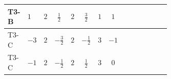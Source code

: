\documentclass[8pt]{article}
\begin{document}
\begin{landscape}
\begin{longtable}{@{}llcccccc >{\raggedright\arraybackslash}p{0.21\linewidth} >{\raggedright\arraybackslash}p{0.21\linewidth} >{\raggedright\arraybackslash}p{0.21\linewidth}@{}}
T3-B & $1$ & $2$ & $\frac{1}{2}$ & $2$ & $\frac{3}{2}$ & $1$ & $1$ & \scriptsize\adjustbox{max width=\linewidth}{$\begin{gathered} -\frac{3}{2} (\left({Y_d}\,\left({Y_d}\right)^{\dagger}\,{Y_u}\right)_{ij}-\left({Y_u}\,\left({Y_u}\right)^{\dagger}\,{Y_u}\right)_{ij})\end{gathered}$} & \scriptsize\adjustbox{max width=\linewidth}{$\begin{gathered} -\frac{9}{4} {g_2}^2 \left({Y_u}\right)_{ij}\end{gathered}$} & \scriptsize\adjustbox{max width=\linewidth}{$\begin{gathered} -8 {g_3}^2 \left({Y_u}\right)_{ij}\end{gathered}$} \\
\midrule
T3-C & $-3$ & $2$ & $-\frac{3}{2}$ & $2$ & $-\frac{1}{2}$ & $3$ & $-1$ & \scriptsize\adjustbox{max width=\linewidth}{$\begin{gathered} -\frac{3}{2} (\left({Y_d}\,\left({Y_d}\right)^{\dagger}\,{Y_u}\right)_{ij}-\left({Y_u}\,\left({Y_u}\right)^{\dagger}\,{Y_u}\right)_{ij})\end{gathered}$} & \scriptsize\adjustbox{max width=\linewidth}{$\begin{gathered} -\frac{9}{4} {g_2}^2 \left({Y_u}\right)_{ij}\end{gathered}$} & \scriptsize\adjustbox{max width=\linewidth}{$\begin{gathered} -8 {g_3}^2 \left({Y_u}\right)_{ij}\end{gathered}$} \\
\midrule
T3-C & $-1$ & $2$ & $-\frac{1}{2}$ & $2$ & $\frac{1}{2}$ & $3$ & $0$ & \scriptsize\adjustbox{max width=\linewidth}{$\begin{gathered} -\frac{3}{2} (\left({Y_d}\,\left({Y_d}\right)^{\dagger}\,{Y_u}\right)_{ij}-\left({Y_u}\,\left({Y_u}\right)^{\dagger}\,{Y_u}\right)_{ij})\end{gathered}$} & \scriptsize\adjustbox{max width=\linewidth}{$\begin{gathered} -\frac{9}{4} {g_2}^2 \left({Y_u}\right)_{ij}\end{gathered}$} & \scriptsize\adjustbox{max width=\linewidth}{$\begin{gathered} -8 {g_3}^2 \left({Y_u}\right)_{ij}\end{gathered}$} \\
\midrule

\end{longtable}
\end{landscape}
\end{document}
